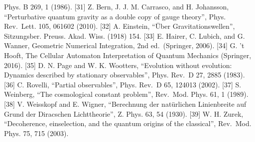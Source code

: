 \documentclass[
]{ltjarticle}
\begin{document}
Phys. B 269, 1 (1986). {[}31{]} Z. Bern, J. J. M. Carrasco, and H.
Johansson, ``Perturbative quantum gravity as a double copy of gauge
theory'', Phys. Rev.~Lett. 105, 061602 (2010). {[}32{]} A. Einstein,
``Über Gravitationswellen'', Sitzungsber. Preuss. Akad. Wiss. (1918)
154. {[}33{]} E. Hairer, C. Lubich, and G. Wanner, Geometric Numerical
Integration, 2nd ed.~(Springer, 2006). {[}34{]} G. 't Hooft, The
Cellular Automaton Interpretation of Quantum Mechanics (Springer, 2016).
{[}35{]} D. N. Page and W. K. Wootters, ``Evolution without evolution:
Dynamics described by stationary observables'', Phys. Rev.~D 27, 2885
(1983). {[}36{]} C. Rovelli, ``Partial observables'', Phys. Rev.~D 65,
124013 (2002). {[}37{]} S. Weinberg, ``The cosmological constant
problem'', Rev.~Mod. Phys. 61, 1 (1989). {[}38{]} V. Weisskopf and E.
Wigner, ``Berechnung der natürlichen Linienbreite auf Grund der
Diracschen Lichttheorie'', Z. Phys. 63, 54 (1930). {[}39{]} W. H. Zurek,
``Decoherence, einselection, and the quantum origins of the classical'',
Rev.~Mod. Phys. 75, 715 (2003).
\end{document}
